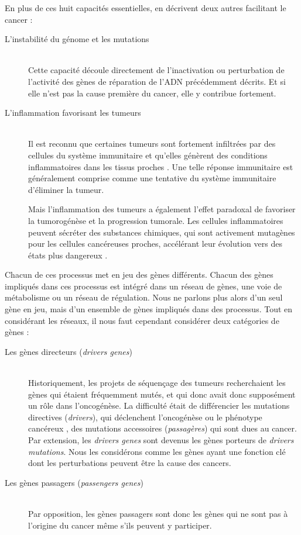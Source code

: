 			En plus de ces huit capacités essentielles, \citeauthor{Hanahan2011} en décrivent deux autres facilitant le cancer :
			\begin{description}
				\item [L'instabilité du génome et les mutations]    \hfill \\
					Cette capacité découle directement de l'inactivation ou perturbation de l'activité des gènes de réparation de l'\acs{ADN} précédemment décrits.
					Et si elle n'est pas la cause première du cancer, elle y contribue fortement.

				\item [L'inflammation favorisant les tumeurs]       \hfill \\
					Il est reconnu que certaines tumeurs sont fortement infiltrées par des cellules du système immunitaire et qu'elles génèrent des conditions inflammatoires dans les tissus proches \citep{Dvorak1986}.
					Une telle réponse immunitaire est généralement comprise comme une tentative du système immunitaire d'éliminer la tumeur.

					Mais l'inflammation des tumeurs a également l'effet paradoxal de favoriser la tumorogénèse et la progression tumorale.
					Les cellules inflammatoires peuvent sécréter des substances chimiques, qui sont activement mutagènes pour les cellules cancéreuses proches, accélérant leur évolution vers des états plus dangereux \citep{Grivennikov2010}.
			\end{description}
			\vspace{1.5ex}

			Chacun de ces processus met en jeu des gènes différents.
			Chacun des gènes impliqués dans ces processus est intégré dans un réseau de gènes, une voie de métabolisme ou un réseau de régulation.
			Nous ne parlons plus alors d'un seul gène en jeu, mais d'un ensemble de gènes impliqués dans des processus.
			Tout en considérant les réseaux, il nous faut cependant considérer deux catégories de gènes :
			\begin{description}
				\item [Les gènes directeurs (\emph{drivers genes})]    \hfill \\
					Historiquement, les projets de séquençage des tumeurs recherchaient les gènes qui étaient fréquemment mutés, et qui donc avait donc supposément un rôle dans l'oncogénèse.
					La difficulté était de différencier les mutations directives (\emph{drivers}), qui déclenchent l'oncogénèse ou le phénotype cancéreux \citep{Greenman2006, Sjoblom2006, Wood2007}, des mutations accessoires (\emph{passagères}) qui sont dues au cancer.
					Par extension, les \emph{drivers genes} sont devenus les gènes porteurs de \emph{drivers mutations}.
					Nous les considérons comme les gènes ayant une fonction clé dont les perturbations peuvent être la cause des cancers.
				\item [Les gènes passagers (\emph{passengers genes})] \hfill \\
					Par opposition, les gènes passagers sont donc les gènes qui ne sont pas à l'origine du cancer même s'ils peuvent y participer.
			\end{description}
			\vspace{1.5ex}

